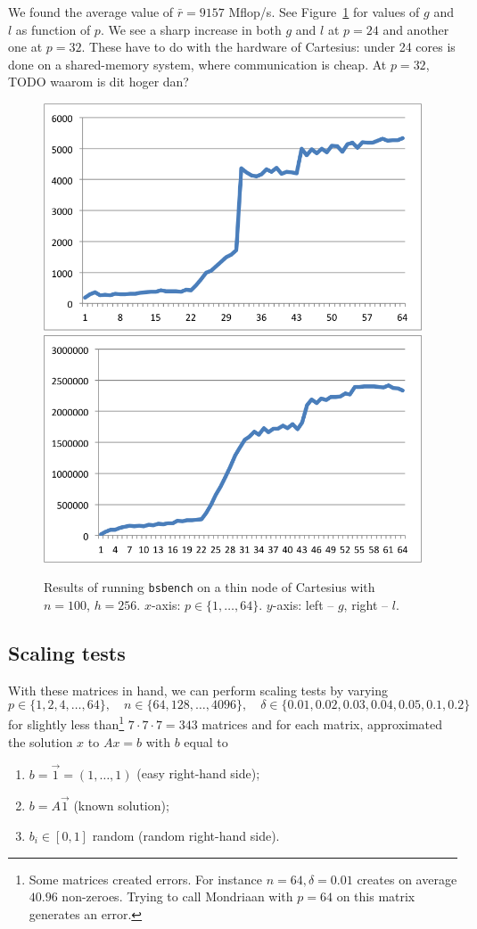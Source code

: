 \documentclass[11pt]{amsart}
\theoremstyle{definition}
\begin{document}
We found the average value of $\bar r = 9157$ Mflop/s. See Figure~\ref{fig:cart} for values of $g$ and $l$ as function of $p$. We see a sharp increase in both $g$ and $l$ at $p=24$ and another one at $p=32$. These have to do with the hardware of Cartesius: under 24 cores is done on a shared-memory system, where communication is cheap. At $p=32$, TODO waarom is dit hoger dan?

\begin{figure}
  \includegraphics[width=0.49\linewidth]{cartg.png}
  \includegraphics[width=0.49\linewidth]{cartl.png}
  \caption{Results of running \texttt{bsbench} on a thin node of Cartesius with $n=100$, $h=256$. $x$-axis: $p \in \{1, \ldots, 64\}$. $y$-axis: left -- $g$, right -- $l$.}
  \label{fig:cart}
\end{figure}

\subsection{Scaling tests}
With these matrices in hand, we can perform scaling tests by varying 
\[ p \in \{1, 2, 4, \ldots, 64\}, \quad n \in \{64, 128, \ldots, 4096 \}, \quad \delta \in \{0.01, 0.02, 0.03, 0.04, 0.05, 0.1, 0.2\} \]
for slightly less than\footnote{Some matrices created errors. For instance $n = 64, \delta = 0.01$ creates on average $40.96$ non-zeroes. Trying to call Mondriaan with $p=64$ on this matrix generates an error.} $7 \cdot 7 \cdot 7 = 343$ matrices and for each matrix, approximated the solution $x$ to $Ax=b$ with $b$ equal to
\begin{enumerate}
  \item $b = \vec 1 = (1, \ldots, 1)$ (easy right-hand side);
  \item $b = A\vec 1$ (known solution);
  \item $b_i \in [0, 1]$ random (random right-hand side).
\end{enumerate}
\end{document}
